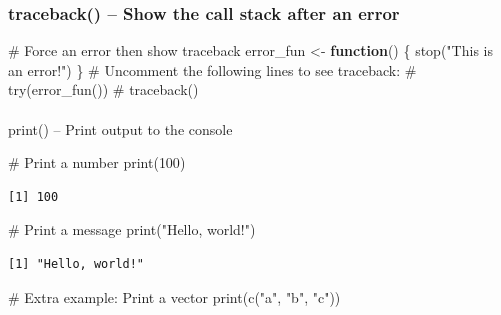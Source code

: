 \documentclass[
  letterpaper,
  DIV=11,
  numbers=noendperiod]{scrartcl}
\makeatletter
\let\oldparagraph\paragraph
\renewcommand{\paragraph}{
    \@ifstar
      \xxxParagraphStar
      \xxxParagraphNoStar
  }
\newcommand{\xxxParagraphStar}[1]{\oldparagraph*{#1}\mbox{}}
\newcommand{\xxxParagraphNoStar}[1]{\oldparagraph{#1}\mbox{}}
\newenvironment{Shaded}{\begin{snugshade}}{\end{snugshade}}
\newcommand{\CommentTok}[1]{\textcolor[rgb]{0.37,0.37,0.37}{#1}}
\newcommand{\ControlFlowTok}[1]{\textcolor[rgb]{0.00,0.23,0.31}{\textbf{#1}}}
\newcommand{\DecValTok}[1]{\textcolor[rgb]{0.68,0.00,0.00}{#1}}
\newcommand{\FunctionTok}[1]{\textcolor[rgb]{0.28,0.35,0.67}{#1}}
\newcommand{\NormalTok}[1]{\textcolor[rgb]{0.00,0.23,0.31}{#1}}
\newcommand{\OtherTok}[1]{\textcolor[rgb]{0.00,0.23,0.31}{#1}}
\newcommand{\StringTok}[1]{\textcolor[rgb]{0.13,0.47,0.30}{#1}}
\makeatother
\begin{document}
\subsubsection{traceback() -- Show the call stack after an
error}\label{traceback-show-the-call-stack-after-an-error}

\begin{Shaded}
\begin{Highlighting}[]
\CommentTok{\#   Force an error then show traceback}
\NormalTok{error\_fun }\OtherTok{\textless{}{-}} \ControlFlowTok{function}\NormalTok{() \{}
  \FunctionTok{stop}\NormalTok{(}\StringTok{"This is an error!"}\NormalTok{)}
\NormalTok{\}}
\CommentTok{\# Uncomment the following lines to see traceback:}
\CommentTok{\# try(error\_fun())}
\CommentTok{\# traceback()}
\end{Highlighting}
\end{Shaded}

\paragraph{print() -- Print output to the
console}\label{print-print-output-to-the-console}

\begin{Shaded}
\begin{Highlighting}[]
\CommentTok{\#   Print a number}
\FunctionTok{print}\NormalTok{(}\DecValTok{100}\NormalTok{)}
\end{Highlighting}
\end{Shaded}

\begin{verbatim}
[1] 100
\end{verbatim}

\begin{Shaded}
\begin{Highlighting}[]
\CommentTok{\#   Print a message}
\FunctionTok{print}\NormalTok{(}\StringTok{"Hello, world!"}\NormalTok{)}
\end{Highlighting}
\end{Shaded}

\begin{verbatim}
[1] "Hello, world!"
\end{verbatim}

\begin{Shaded}
\begin{Highlighting}[]
\CommentTok{\# Extra example: Print a vector}
\FunctionTok{print}\NormalTok{(}\FunctionTok{c}\NormalTok{(}\StringTok{"a"}\NormalTok{, }\StringTok{"b"}\NormalTok{, }\StringTok{"c"}\NormalTok{))}
\end{Highlighting}
\end{Shaded}
\end{document}
